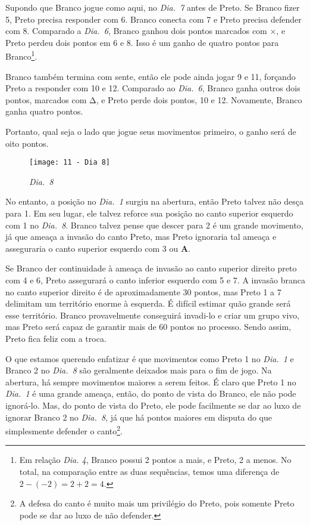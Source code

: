 Supondo que Branco jogue como aqui, no \emph{Dia.\@~7} antes de Preto. Se Branco fizer 5, Preto precisa responder com 6. Branco conecta com 7 e Preto precisa defender com 8. Comparado a \emph{Dia.\@~6}, Branco ganhou dois pontos marcados com $\times$, e Preto perdeu dois pontos em 6 e 8. Isso é um ganho de quatro pontos para Branco\footnote{Em relação \emph{Dia. 4}, Branco possui 2 pontos a mais, e Preto, 2 a menos. No total, na comparação entre as duas sequências, temos uma diferença de $2 - (-2) = 2 + 2 = 4$.}.

Branco também termina com sente, então ele pode ainda jogar 9 e 11, forçando Preto a responder com 10 e 12. Comparado ao \emph{Dia.\@~6}, Branco ganha outros dois pontos, marcados com \(\increment\), e Preto perde dois pontos, 10 e 12. Novamente, Branco ganha quatro pontos.

Portanto, qual seja o lado que jogue seus movimentos primeiro, o ganho será de oito pontos.

\pagebreak

\begin{wrapfigure}{r}{60mm}
    \vspace{-20pt}
    \begin{center}
        \texttt{[image: 11 - Dia 8]}
        \captionsetup{justification=centering}
        \caption*{\emph{Dia.\@~8}}
    \end{center}
    \vspace{-25pt}
\end{wrapfigure}

No entanto, a posição no \emph{Dia.\@~1} surgiu na abertura, então Preto talvez não desça para 1. Em seu lugar, ele talvez reforce sua posição no canto superior esquerdo com 1 no \emph{Dia.\@~8}. Branco talvez pense que descer para 2 é um grande movimento, já que ameaça a invasão do canto Preto, mas Preto ignoraria  tal ameaça e asseguraria o canto superior esquerdo com 3 ou \textbf{A}.

Se Branco der continuidade à ameaça de invasão ao canto superior direito preto com 4 e 6, Preto assegurará o canto inferior esquerdo com 5 e 7. A invasão branca no canto superior direito é de aproximadamente 30 pontos, mas Preto 1 a 7 delimitam um território enorme à esquerda. É difícil estimar quão grande será esse território. Branco provavelmente conseguirá invadi-lo e criar um grupo vivo, mas Preto será capaz de garantir mais de 60 pontos no processo. Sendo assim, Preto fica feliz com a troca.

O que estamos querendo enfatizar é que movimentos como Preto 1 no \emph{Dia.\@~1} e Branco 2 no \emph{Dia.\@~8} são geralmente deixados mais para o fim de jogo. Na abertura, há sempre movimentos maiores a serem feitos. É claro que Preto 1 no \emph{Dia.\@~1} é uma grande ameaça, então, do ponto de vista do Branco, ele não pode ignorá-lo. Mas, do ponto de vista do Preto, ele pode facilmente se dar ao luxo de ignorar Branco 2 no \emph{Dia.\@~8}, já que há pontos maiores em disputa do que simplesmente defender o canto\footnote{A defesa do canto é muito mais um privilégio do Preto, pois somente Preto pode se dar ao luxo de não defender.}.

